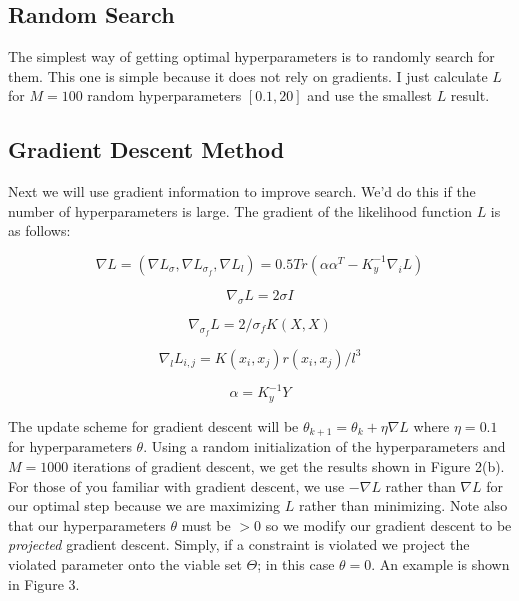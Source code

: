 \documentclass[12pt]{article}
\begin{document}
\subsection{Random Search}

The simplest way of getting optimal hyperparameters is to randomly search for them. This one is simple because it does not rely on gradients. I just calculate $L$ for $M = 100$ random hyperparameters $[0.1,20]$ and use the smallest $L$ result.

\subsection{Gradient Descent Method}

Next we will use gradient information to improve search. We'd do this if the number of hyperparameters is large. The gradient of the likelihood function $L$ is as follows:

\begin{equation}
\nabla L = (\nabla L_{\sigma}, \nabla L_{\sigma_{f}}, \nabla L_{l}) = 0.5 Tr(\alpha \alpha^{T} - K_y^{-1} \nabla_{i}L)
\end{equation}

\begin{equation}
\nabla_{\sigma} L = 2\sigma I
\end{equation}

\begin{equation}
\nabla_{\sigma_{f}} L = 2/\sigma_{f} K(X,X)
\end{equation}

\begin{equation}
\nabla_{l} L_{i,j} = K(x_{i},x_{j}) r(x_{i},x_{j}) / l^{3}
\end{equation}

\begin{equation}
\alpha = K_y^{-1} Y
\end{equation}

The update scheme for gradient descent will be $\theta_{k+1} = \theta_{k} + \eta \nabla L$ where $\eta = 0.1$ for hyperparameters $\theta$. Using a random initialization of the hyperparameters and $M = 1000$ iterations of gradient descent, we get the results shown in Figure 2(b). For those of you familiar with gradient descent, we use $-\nabla L$ rather than $\nabla L$ for our optimal step because we are maximizing $L$ rather than minimizing. Note also that our hyperparameters $\theta$ must be $>0$ so we modify our gradient descent to be \emph{projected} gradient descent. Simply, if a constraint is violated we project the violated parameter onto the viable set $\Theta$; in this case $\theta = 0$. An example is shown in Figure 3.
\end{document}
